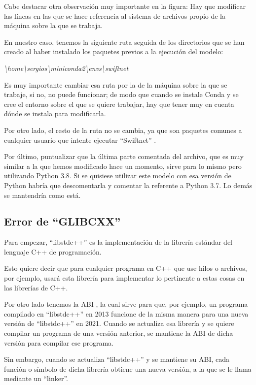 Cabe destacar otra observación muy importante en la figura: Hay que modificar las líneas en las que se hace referencia al sistema de archivos propio de la máquina sobre la que se trabaja.

En nuestro caso, tenemos la siguiente ruta seguida de los directorios que se han creado al haber instalado los paquetes previos a la ejecución del modelo:

\begin{center}
\textit{\textbackslash{home}\textbackslash{sergios}\textbackslash{miniconda2}\textbackslash{envs}\textbackslash{swiftnet}}
\end{center}

Es muy importante cambiar esa ruta por la de la máquina sobre la que se trabaje, si no, no puede funcionar; de modo que cuando se instale Conda y se cree el entorno sobre el que se quiere trabajar, hay que tener muy en cuenta dónde se instala para modificarla.

Por otro lado, el resto de la ruta no se cambia, ya que son paquetes comunes a cualquier usuario que intente ejecutar ``Swiftnet'' \cite{swiftnet}.

Por último, puntualizar que la última parte comentada del archivo, que es muy similar a la que hemos modificado hace un momento, sirve para lo mismo pero utilizando Python 3.8. Si se quisiese utilizar este modelo con esa versión de Python habría que descomentarla y comentar la referente a Python 3.7. Lo demás se mantendría como está.

\subsection{Error de ``GLIBCXX''}

Para empezar, ``libstdc++'' \cite{glibcxx} es la implementación de la librería estándar del lenguaje C++ de programación.

Esto quiere decir que para cualquier programa en C++ que use hilos o archivos, por ejemplo, usará esta librería para implementar lo pertinente a estas cosas en las librerías de C++.

Por otro lado tenemos la \ac{ABI} \cite{glibcxx}, la cual sirve para que, por ejemplo, un programa compilado en ``libstdc++'' en 2013 funcione de la misma manera para una nueva versión de ``libstdc++'' en 2021. Cuando se actualiza esa librería y se quiere compilar un programa de una versión anterior, se mantiene la ABI de dicha versión para compilar ese programa.

Sin embargo, cuando se actualiza ``libstdc++'' y se mantiene su ABI, cada función o símbolo de dicha librería obtiene una nueva versión, a la que se le llama mediante un ``linker''.

